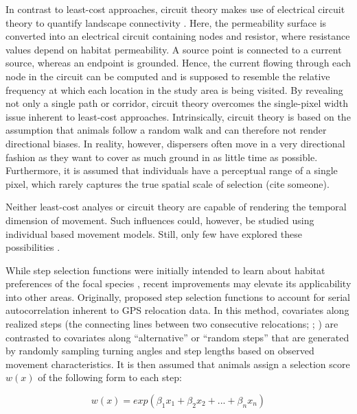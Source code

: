 \documentclass[abstract=on,10pt,a4paper,bibliography=totocnumbered]{article}
\begin{document}
In contrast to least-cost approaches, circuit theory makes use of electrical
circuit theory to quantify landscape connectivity \citep{McRae.2006,
McRae.2008}. Here, the permeability surface is converted into an electrical
circuit containing nodes and resistor, where resistance values depend on habitat
permeability. A source point is connected to a current source, whereas an
endpoint is grounded. Hence, the current flowing through each node in the
circuit can be computed and is supposed to resemble the relative frequency at
which each location in the study area is being visited. By revealing not only a
single path or corridor, circuit theory overcomes the single-pixel width issue
inherent to least-cost approaches. Intrinsically, circuit theory is based on the
assumption that animals follow a random walk and can therefore not render
directional biases. In reality, however, dispersers often move in a very
directional fashion as they want to cover as much ground in as little time as
possible. Furthermore, it is assumed that individuals have a perceptual range of
a single pixel, which rarely captures the true spatial scale of selection (cite
someone).

Neither least-cost analyes or circuit theory are capable of rendering the
temporal dimension of movement. Such influences could, however, be studied using
individual based movement models. Still, only few have explored these
possibilities \citep{Kanagaraj.2013, Hauenstein.2019, Zeller.2020}.

While step selection functions were initially intended to learn about habitat
preferences of the focal species \citep{Fortin.2005}, recent improvements may
elevate its applicability into other areas. Originally, \cite{Fortin.2005}
proposed step selection functions to account for serial autocorrelation inherent
to GPS relocation data. In this method, covariates along realized steps (the
connecting lines between two consecutive relocations; ; \citealp{Turchin.1998})
are contrasted to covariates along  ``alternative''  or  ``random steps'' that
are generated by randomly sampling turning angles and step lengths based on
observed movement characteristics. It is then assumed that animals assign a
selection score \(w(x)\) of the following form to each step:

\begin{equation}
\label{EQ1}
  w(x) = exp(\beta_1 x_1 + \beta_2 x_2 + ... + \beta_n x_n)
\end{equation}
\end{document}
